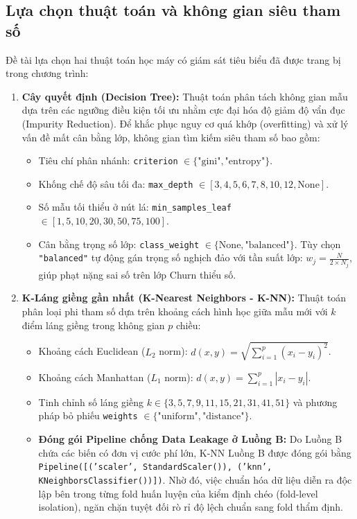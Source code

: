 \documentclass[12pt,a4paper]{article}
\begin{document}
\subsection{Lựa chọn thuật toán và không gian siêu tham số}
Đề tài lựa chọn hai thuật toán học máy có giám sát tiêu biểu đã được trang bị trong chương trình:
\begin{enumerate}
    \item \textbf{Cây quyết định (Decision Tree):}
    Thuật toán phân tách không gian mẫu dựa trên các ngưỡng điều kiện tối ưu nhằm cực đại hóa độ giảm độ vẩn đục (Impurity Reduction). Để khắc phục nguy cơ quá khớp (overfitting) và xử lý vấn đề mất cân bằng lớp, không gian tìm kiếm siêu tham số bao gồm:
    \begin{itemize}
        \item Tiêu chí phân nhánh: \texttt{criterion} $\in \{\text{"gini"}, \text{"entropy"}\}$.
        \item Khống chế độ sâu tối đa: \texttt{max\_depth} $\in [3, 4, 5, 6, 7, 8, 10, 12, \text{None}]$.
        \item Số mẫu tối thiểu ở nút lá: \texttt{min\_samples\_leaf} $\in [1, 5, 10, 20, 30, 50, 75, 100]$.
        \item Cân bằng trọng số lớp: \texttt{class\_weight} $\in \{\text{None}, \text{"balanced"}\}$. Tùy chọn \texttt{"balanced"} tự động gán trọng số nghịch đảo với tần suất lớp: $w_j = \frac{N}{2 \times N_j}$, giúp phạt nặng sai số trên lớp Churn thiểu số.
    \end{itemize}

    \item \textbf{K-Láng giềng gần nhất (K-Nearest Neighbors - K-NN):}
    Thuật toán phân loại phi tham số dựa trên khoảng cách hình học giữa mẫu mới với $k$ điểm láng giềng trong không gian $p$ chiều:
    \begin{itemize}
        \item Khoảng cách Euclidean ($L_2$ norm): $d(x, y) = \sqrt{\sum_{i=1}^p (x_i - y_i)^2}$.
        \item Khoảng cách Manhattan ($L_1$ norm): $d(x, y) = \sum_{i=1}^p |x_i - y_i|$.
        \item Tinh chỉnh số láng giềng $k \in \{3, 5, 7, 9, 11, 15, 21, 31, 41, 51\}$ và phương pháp bỏ phiếu \texttt{weights} $\in \{\text{"uniform"}, \text{"distance"}\}$.
        \item \textbf{Đóng gói Pipeline chống Data Leakage ở Luồng B:} Do Luồng B chứa các biến có đơn vị cước phí lớn, K-NN Luồng B được đóng gói bằng \texttt{Pipeline([('scaler', StandardScaler()), ('knn', KNeighborsClassifier())])}. Nhờ đó, việc chuẩn hóa dữ liệu diễn ra độc lập bên trong từng fold huấn luyện của kiểm định chéo (fold-level isolation), ngăn chặn tuyệt đối rò rỉ độ lệch chuẩn sang fold thẩm định.
    \end{itemize}
\end{enumerate}
\end{document}
